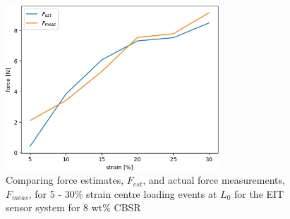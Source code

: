 \begin{figure}[H]
    \centering
    \includegraphics[width=8cm]{Figures/CBSR_8p_1_9push_XXstrain_60s_3_force_est_frame31.jpg}
    \caption{Comparing force estimates, $F_{est}$, and actual force measurements, $F_{meas}$, for 5 - 30\% strain centre loading events at $L_0$ for the EIT sensor system for 8 wt\% CBSR}
    \label{fig:stress_est_8p_3}
\end{figure}
